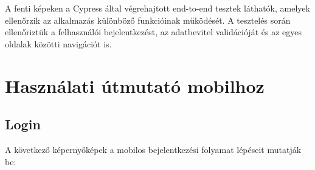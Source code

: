 \documentclass[12pt]{report}
\begin{document}
A fenti képeken a Cypress által végrehajtott end-to-end tesztek láthatók, amelyek ellenőrzik az alkalmazás különböző funkcióinak működését. A tesztelés során ellenőriztük a felhasználói bejelentkezést, az adatbevitel validációját és az egyes oldalak közötti navigációt is.

\chapter{Használati útmutató mobilhoz}
\section{Login}
A következő képernyőképek a mobilos bejelentkezési folyamat lépéseit mutatják be:

\begin{figure}[H]
    \centering
    \begin{minipage}[b]{0.23\textwidth}
        \centering

\end{minipage}
\end{figure}
\end{document}
